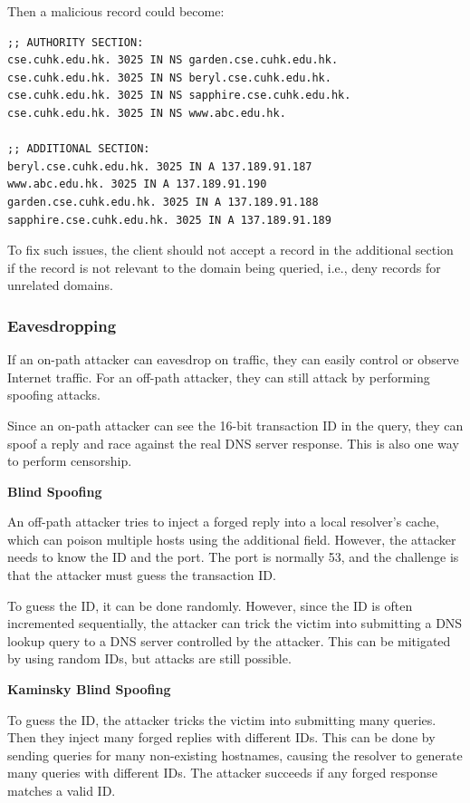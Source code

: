 Then a malicious record could become:

\begin{verbatim}
;; AUTHORITY SECTION:
cse.cuhk.edu.hk. 3025 IN NS garden.cse.cuhk.edu.hk.
cse.cuhk.edu.hk. 3025 IN NS beryl.cse.cuhk.edu.hk.
cse.cuhk.edu.hk. 3025 IN NS sapphire.cse.cuhk.edu.hk.
cse.cuhk.edu.hk. 3025 IN NS www.abc.edu.hk.

;; ADDITIONAL SECTION:
beryl.cse.cuhk.edu.hk. 3025 IN A 137.189.91.187
www.abc.edu.hk. 3025 IN A 137.189.91.190
garden.cse.cuhk.edu.hk. 3025 IN A 137.189.91.188
sapphire.cse.cuhk.edu.hk. 3025 IN A 137.189.91.189
\end{verbatim}

To fix such issues, the client should not accept a record in the additional section if the record is not relevant to the domain being queried, i.e., deny records for unrelated domains. 

\subsubsection{Eavesdropping}
If an on-path attacker can eavesdrop on traffic, they can easily control or observe Internet traffic. For an off-path attacker, they can still attack by performing spoofing attacks. 

Since an on-path attacker can see the 16-bit transaction ID in the query, they can spoof a reply and race against the real DNS server response. This is also one way to perform censorship. 

\textbf{Blind Spoofing} 

An off-path attacker tries to inject a forged reply into a local resolver's cache, which can poison multiple hosts using the additional field. However, the attacker needs to know the ID and the port. The port is normally 53, and the challenge is that the attacker must guess the transaction ID. 

To guess the ID, it can be done randomly. However, since the ID is often incremented sequentially, the attacker can trick the victim into submitting a DNS lookup query to a DNS server controlled by the attacker. This can be mitigated by using random IDs, but attacks are still possible. 

\textbf{Kaminsky Blind Spoofing}

To guess the ID, the attacker tricks the victim into submitting many queries. Then they inject many forged replies with different IDs. This can be done by sending queries for many non-existing hostnames, causing the resolver to generate many queries with different IDs. The attacker succeeds if any forged response matches a valid ID. 

